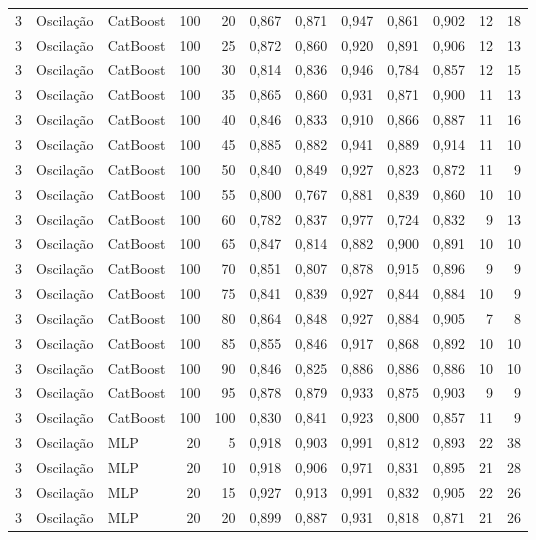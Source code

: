 \begin{longtable}{@{}rllrrrrrrrrr@{}}
3 & Oscilação & CatBoost & 100 & 20 & 0,867 & 0,871 & 0,947 & 0,861 & 0,902 & 12 & 18 \\
3 & Oscilação & CatBoost & 100 & 25 & 0,872 & 0,860 & 0,920 & 0,891 & 0,906 & 12 & 13 \\
3 & Oscilação & CatBoost & 100 & 30 & 0,814 & 0,836 & 0,946 & 0,784 & 0,857 & 12 & 15 \\
3 & Oscilação & CatBoost & 100 & 35 & 0,865 & 0,860 & 0,931 & 0,871 & 0,900 & 11 & 13 \\
3 & Oscilação & CatBoost & 100 & 40 & 0,846 & 0,833 & 0,910 & 0,866 & 0,887 & 11 & 16 \\
3 & Oscilação & CatBoost & 100 & 45 & 0,885 & 0,882 & 0,941 & 0,889 & 0,914 & 11 & 10 \\
3 & Oscilação & CatBoost & 100 & 50 & 0,840 & 0,849 & 0,927 & 0,823 & 0,872 & 11 & 9 \\
3 & Oscilação & CatBoost & 100 & 55 & 0,800 & 0,767 & 0,881 & 0,839 & 0,860 & 10 & 10 \\
3 & Oscilação & CatBoost & 100 & 60 & 0,782 & 0,837 & 0,977 & 0,724 & 0,832 & 9 & 13 \\
3 & Oscilação & CatBoost & 100 & 65 & 0,847 & 0,814 & 0,882 & 0,900 & 0,891 & 10 & 10 \\
3 & Oscilação & CatBoost & 100 & 70 & 0,851 & 0,807 & 0,878 & 0,915 & 0,896 & 9 & 9 \\
3 & Oscilação & CatBoost & 100 & 75 & 0,841 & 0,839 & 0,927 & 0,844 & 0,884 & 10 & 9 \\
3 & Oscilação & CatBoost & 100 & 80 & 0,864 & 0,848 & 0,927 & 0,884 & 0,905 & 7 & 8 \\
3 & Oscilação & CatBoost & 100 & 85 & 0,855 & 0,846 & 0,917 & 0,868 & 0,892 & 10 & 10 \\
3 & Oscilação & CatBoost & 100 & 90 & 0,846 & 0,825 & 0,886 & 0,886 & 0,886 & 10 & 10 \\
3 & Oscilação & CatBoost & 100 & 95 & 0,878 & 0,879 & 0,933 & 0,875 & 0,903 & 9 & 9 \\
3 & Oscilação & CatBoost & 100 & 100 & 0,830 & 0,841 & 0,923 & 0,800 & 0,857 & 11 & 9 \\
3 & Oscilação & MLP & 20 & 5 & 0,918 & 0,903 & 0,991 & 0,812 & 0,893 & 22 & 38 \\
3 & Oscilação & MLP & 20 & 10 & 0,918 & 0,906 & 0,971 & 0,831 & 0,895 & 21 & 28 \\
3 & Oscilação & MLP & 20 & 15 & 0,927 & 0,913 & 0,991 & 0,832 & 0,905 & 22 & 26 \\
3 & Oscilação & MLP & 20 & 20 & 0,899 & 0,887 & 0,931 & 0,818 & 0,871 & 21 & 26 \\

\end{longtable}

